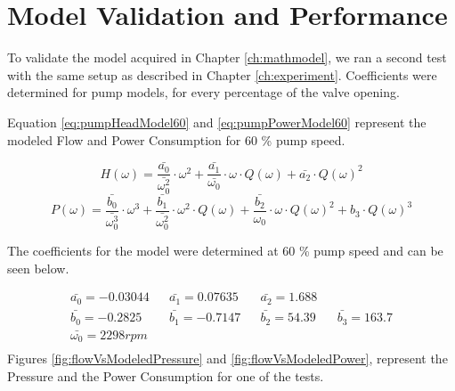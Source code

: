 \chapter{Model Validation and Performance}\label{ch:modValPerf}

To validate the model acquired in Chapter \ref{ch:mathmodel}, we ran a second test with the 
same setup as described in Chapter \ref{ch:experiment}. Coefficients were determined for pump models,
for every percentage of the valve opening.

Equation \ref{eq:pumpHeadModel60} and \ref{eq:pumpPowerModel60} represent the modeled Flow and Power 
Consumption for 60 \% pump speed.

\begin{equation}
	H(\omega) = \frac{\bar{a_0}}{\bar{\omega_0^2}} \cdot \omega^2 + \frac{\bar{a_1}}{\bar{\omega_0}} \cdot \omega \cdot Q(\omega) + \bar{a_2} \cdot Q(\omega)^2
	\label{eq:pumpHeadModel60}
\end{equation}
\begin{equation}
	P(\omega) = \frac{\bar{b_0}}{\bar{\omega_0^3}} \cdot \omega^3 + \frac{\bar{b_1}}{\bar{\omega_0^2}} \cdot \omega^2 \cdot Q(\omega) + \frac{\bar{b_2}}{\omega_0} \cdot \omega \cdot Q(\omega)^2 + b_3 \cdot Q(\omega)^3
	\label{eq:pumpPowerModel60}
\end{equation}

The coefficients for the model were determined at 60 \% pump speed and can be seen below.

\begin{align*}
	\bar{a_0} = -0.03044 && \bar{a_1} = 0.07635  && \bar{a_2} = 1.688  \\
	\bar{b_0} = -0.2825 && \bar{b_1} = -0.7147 && \bar{b_2} = 54.39 && \bar{b_3} = 163.7 \\
	\bar{\omega_0} = 2298 rpm \\
\end{align*}
\newpage
Figures \ref{fig:flowVsModeledPressure} and \ref{fig:flowVsModeledPower}, represent the Pressure and 
the Power Consumption for one of the tests.

